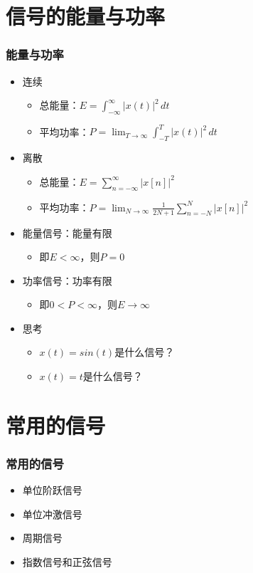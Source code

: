 \documentclass[CJKutf8,dvipsnames,table]{beamer}
\begin{document}
\begin{CJK*}{UTF8}{song}
  \section{信号的能量与功率}
  
  \begin{frame}
    \frametitle{能量与功率}
    \begin{itemize}
    \item 连续
        \begin{itemize}
        \item 总能量：$E=\int_{-\infty}^{\infty} |x(t)|^2 \,dt$
        \item 平均功率：$P=\lim_{T\to\infty} \int_{-T}^{T} |x(t)|^2 \,dt $
        \end{itemize}
    \end{itemize}
    \begin{itemize}
    \item 离散   
        \begin{itemize}
        \item 总能量：$E=\sum_{n=-\infty}^{\infty}|x[n]|^2$
        \item 平均功率：$P=\lim_{N\to\infty}\frac{1}{2N+1}\sum_{n=-N}^{N}|x[n]|^2$
        \end{itemize}
    \item 能量信号：能量有限
        \begin{itemize}
        \item 即$E<\infty$，则$P=0$
        \end{itemize}
    \item 功率信号：功率有限
        \begin{itemize}
        \item 即$0<P<\infty$，则$E\to\infty$
        \end{itemize}
    \item 思考
        \begin{itemize}
        \item $x(t)=sin(t)$是什么信号？
        \item $x(t)=t$是什么信号？
        \end{itemize}
    \end{itemize}
  \end{frame}  
  
  \section{常用的信号}
  
  \begin{frame}
    \frametitle{常用的信号}
    \begin{itemize}
    \item 单位阶跃信号
    \item 单位冲激信号   
    \item 周期信号
    \item 指数信号和正弦信号
    \end{itemize}
  \end{frame}  


\end{CJK*}
\end{document}
